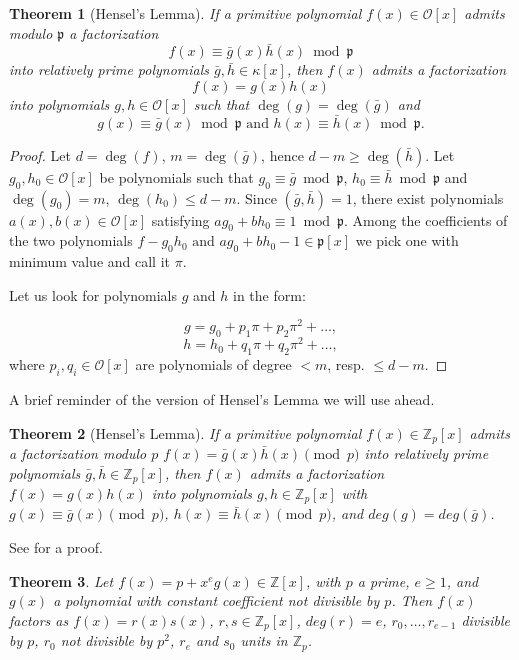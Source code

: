 \documentclass{article}
\newtheorem{theorem}{Theorem}
\begin{document}
\begin{theorem}[Hensel's Lemma]
If a primitive polynomial $f(x) \in \mathcal{O}[x]$ admits modulo $\mathfrak{p}$ a factorization
$$f(x) \equiv \bar{g}(x)\bar{h}(x) \bmod{\mathfrak{p}}$$
into relatively prime polynomials $\bar{g},\bar{h} \in \kappa[x]$, then $f(x)$ admits a factorization
$$f(x) = g(x)h(x)$$
into polynomials $g,h \in \mathcal{O}[x]$ such that $\deg(g) = \deg(\bar{g})$ and
$$g(x) \equiv \bar{g}(x) \bmod{\mathfrak{p}} \mbox{ and } h(x) \equiv \bar{h}(x) \bmod{\mathfrak{p}}.$$
\end{theorem}
\begin{proof}
Let $d = \deg(f)$, $m = \deg(\bar{g})$, hence $d - m \ge \deg(\bar{h})$. Let $g_0, h_0 \in \mathcal{O}[x]$ be polynomials such that $g_0 \equiv \bar{g} \bmod \mathfrak{p}$, $h_0 \equiv \bar{h} \bmod \mathfrak{p}$ and $\deg(g_0) = m$, $\deg(h_0) \le d-m$. Since $(
\bar{g}, \bar{h}) = 1$, there exist polynomials $a(x), b(x) \in \mathcal{O}[x]$ satisfying $ag_0 + bh_0 \equiv 1 \bmod \mathfrak{p}$.  Among the coefficients of the two polynomials $f-g_0h_0 \mbox{ and } ag_0 + bh_0 - 1 \in \mathfrak{p}[x]$ we pick one with minimum value and call it $\pi$.

Let us look for polynomials $g$ and $h$ in the form:

$$g = g_0 + p_1\pi + p_2\pi^2 + \ldots,$$
$$h = h_0 + q_1\pi + q_2\pi^2 + \ldots,$$
where $p_i, q_i \in \mathcal{O}[x]$ are polynomials of degree $< m$, resp. $\le d - m$.
\end{proof}

A brief reminder of the version of Hensel's Lemma we will use ahead.

\begin{theorem}[Hensel's Lemma]
If a primitive polynomial $f(x) \in \mathbb{Z}_p[x]$ admits a factorization modulo $p$ $f(x) = \bar{g}(x)\bar{h}(x) \pmod{p}$ into relatively prime polynomials $\bar{g},\bar{h} \in \mathbb{Z}_p[x]$, then $f(x)$ admits a factorization $f(x) = g(x)h(x)$ into polynomials $g,h \in \mathbb{Z}_p[x]$ with $g(x) \equiv \bar{g}(x) \pmod{p}$, $h(x) \equiv \bar{h}(x) \pmod{p}$, and $deg(g) = deg(\bar{g})$.

\end{theorem}

See \cite{MR1697859} for a proof.

\begin{theorem} \label{factor}
Let $f(x) = p + x^e g(x) \in \mathbb{Z}[x]$, with $p$ a prime, $e \ge 1$, and $g(x)$ a polynomial with constant coefficient not divisible by $p$.  Then $f(x)$ factors as $f(x) = r(x)s(x)$, $r,s \in \mathbb{Z}_p[x]$, $deg(r) = e$, $r_0, \ldots, r_{e-1}$ divisible by $p$, $r_0$ not divisible by $p^2$, $r_e$ and $s_0$ units in $\mathbb{Z}_p$.
\end{theorem}
\end{document}
